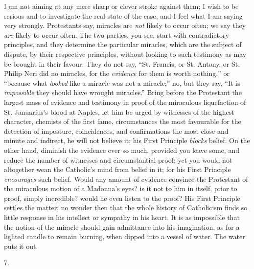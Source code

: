 I am not aiming at any mere sharp or clever stroke against them; I wish to be serious and to investigate the
real state of the case, and I feel what I am saying very
strongly. Protestants say, miracles are \emph{not}
likely to occur often; we say they \emph{are} likely to
occur often. The two parties, you see, start with
contradictory principles, and they determine the
particular miracles, which are the subject of dispute, by
their respective principles, without looking to such
testimony as may be brought in their favour. They do not
say, ``St. Francis, or St. Antony, or St. Philip Neri
did no miracles, for the \emph{evidence} for them is
worth nothing,'' or ``because what \emph{looked}
like a miracle was not a miracle;'' no, but they say,
``It is \emph{impossible} they should have wrought
miracles.'' Bring before the Protestant the largest
mass of evidence and testimony in proof of the miraculous
liquefaction of St. Januarius's blood at Naples, let him
be urged by witnesses of the highest character, chemists
of the first fame, circumstances the most favourable for
the detection of imposture, coincidences, and
confirmations the most close and minute and indirect, he
will not believe it; his First Principle \emph{blocks}
belief. On the other hand, diminish the evidence ever so
much, provided you leave some, and reduce the number of
witnesses and circumstantial proof; yet you would not
altogether wean the Catholic's mind from belief in it;
for his First Principle \emph{encourages} such belief.
Would any amount of evidence convince the Protestant of
the miraculous motion of a Madonna's eyes? is it not to
him in itself, prior to proof, simply incredible? would
he even listen to the proof? His First Principle settles
the matter; no wonder then that the whole history of
Catholicism finds so little response in his intellect or
sympathy in his heart. It is as impossible that the
notion of the miracle should gain admittance into his
imagination, as for a lighted candle to remain burning,
when dipped into a vessel of water. The water puts it
out.

7.

